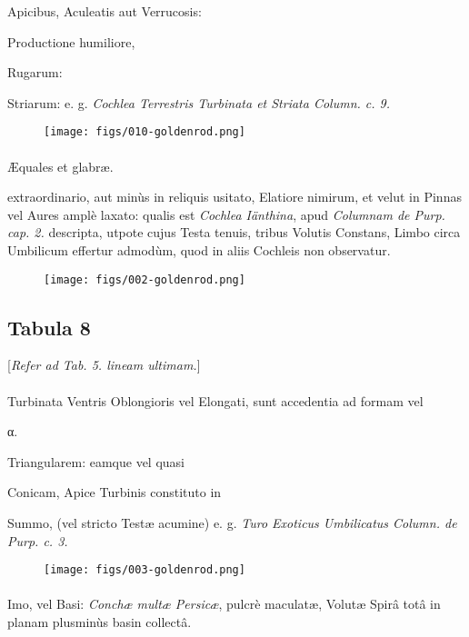 \documentclass[a4paper, 11pt, oneside, polutonikogreek, german]{article}
\begin{document}
Apicibus, Aculeatis aut Verrucosis:

Productione humiliore,

Rugarum:

Striarum: e. g. \emph{Cochlea Terrestris Turbinata et Striata Column. c. 9.}

\begin{figure}[H]
\centering
\texttt{[image: figs/010-goldenrod.png]}
\end{figure}
\paragraph{}
Æquales et glabræ.

extraordinario, aut minùs in reliquis usitato, Elatiore nimirum, et velut in Pinnas vel Aures amplè laxato: qualis est \emph{Cochlea Iänthina}, apud \emph{Columnam de Purp. cap. 2.} descripta, utpote cujus Testa tenuis, tribus Volutis Constans, Limbo circa Umbilicum effertur admodùm, quod in aliis Cochleis non observatur.

\begin{figure}[H]
\centering
\texttt{[image: figs/002-goldenrod.png]}
\end{figure}
\clearpage
\subsection{Tabula 8}
\begin{center}
[\emph{Refer ad Tab. 5. lineam ultimam.}]
\end{center}
\paragraph{}
Turbinata Ventris Oblongioris vel Elongati, sunt accedentia ad formam vel

α.

Triangularem: eamque vel quasi

Conicam, Apice Turbinis constituto in

Summo, (vel stricto Testæ acumine) e. g. \emph{Turo Exoticus Umbilicatus Column. de Purp. c. 3.}

\begin{figure}[H]
\centering
\texttt{[image: figs/003-goldenrod.png]}
\end{figure}
\paragraph{}
Imo, vel Basi: \emph{Conchæ multæ Persicæ}, pulcrè maculatæ, Volutæ Spirâ totâ in planam plusminùs basin collectâ.
\end{document}
